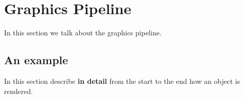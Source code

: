 
\section{Graphics Pipeline}

In this section we talk about the graphics pipeline.

\subsection{An example}

In this section describe {\bf in detail} from the start to the end how an object is rendered.
